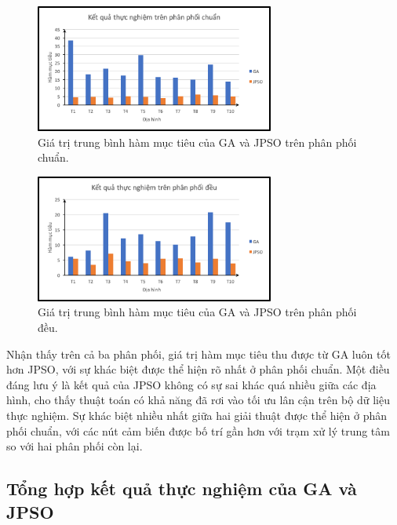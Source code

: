 \documentclass{hust}
\begin{document}
\begin{figure}[H]
	\centering
	\includegraphics[width=0.7\textwidth]{images/medium_normal.png}
	\caption{Giá trị trung bình hàm mục tiêu của \gls{GA} và \gls{JPSO} trên phân phối chuẩn.} \label{fig:medium_norm}
\end{figure}

\begin{figure}[H]
	\centering
	\includegraphics[width=0.7\textwidth]{images/medium_uniform.png}
	\caption{Giá trị trung bình hàm mục tiêu của \gls{GA} và \gls{JPSO} trên phân phối đều.} \label{fig:medium_uniform}
\end{figure}


Nhận thấy trên cả ba phân phối, giá trị hàm mục tiêu thu được từ \gls{GA} luôn tốt hơn \gls{JPSO}, với sự khác biệt được thể hiện rõ nhất ở phân phối chuẩn. Một điều đáng lưu ý là kết quả của \gls{JPSO} không có sự sai khác quá nhiều giữa các địa hình, cho thấy thuật toán có khả năng đã rơi vào tối ưu lân cận trên bộ dữ liệu thực nghiệm. Sự khác biệt nhiều nhất giữa hai giải thuật được thể hiện ở phân phối chuẩn, với các nút cảm biến được bố trí gần hơn với trạm xử lý trung tâm so với hai phân phối còn lại.

\pagebreak
\subsection{Tổng hợp kết quả thực nghiệm của \gls{GA} và \gls{JPSO}}

\end{document}
